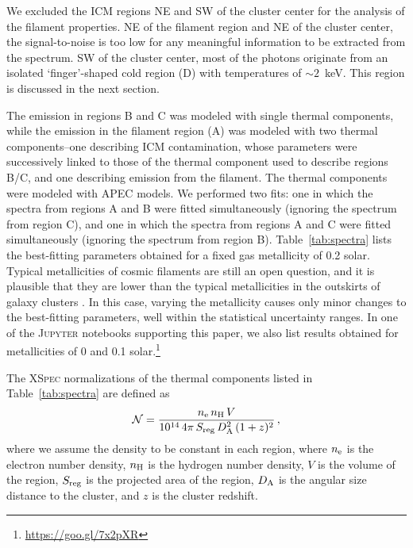 \documentclass[11pt,a4paper,useAMS,iop]{emulateapj}
\begin{document}
We excluded the ICM regions NE and SW of the cluster center for the analysis of the filament properties. NE of the filament region and NE of the cluster center, the signal-to-noise is too low for any meaningful information to be extracted from the spectrum. SW of the cluster center, most of the photons originate from an isolated `finger'-shaped cold region (D) with temperatures of $\sim 2$~keV. This region is discussed in the next section. 

The emission in regions B and C was modeled with single thermal components, while the emission in the filament region (A) was modeled with two thermal components--one describing ICM contamination, whose parameters were successively linked to those of the thermal component used to describe regions B/C, and one describing emission from the filament. The thermal components were modeled with APEC models. We performed two fits: one in which the spectra from regions A and B were fitted simultaneously (ignoring the spectrum from region C), and one in which the spectra from regions A and C were fitted simultaneously (ignoring the spectrum from region B). Table~\ref{tab:spectra} lists the best-fitting parameters obtained for a fixed gas metallicity of 0.2 solar. Typical metallicities of cosmic filaments are still an open question, and it is plausible that they are lower than the typical metallicities in the outskirts of galaxy clusters \citep[$\sim 0.2-0.3$ solar; e.g.][]{Simionescu2015}. In this case, varying the metallicity causes only minor changes to the best-fitting parameters, well within the statistical uncertainty ranges. In one of the \textsc{Jupyter} notebooks supporting this paper, we also list results obtained for metallicities of 0 and 0.1 solar.\footnote{\url{https://goo.gl/7x2pXR}}

The \textsc{XSpec} normalizations of the thermal components listed in Table~\ref{tab:spectra} are defined as
\begin{equation}
	\mathcal{N} = \frac{n_{\rm e} \, n_{\rm H} \, V}{10^{14} \, 4\pi \, S_{\rm reg} \, D_{\rm A}^2 \, (1+z)^2} \, , 
\label{eq:norm}
\end{equation}
where we assume the density to be constant in each region, where $n_{\rm e}$ is the electron number density, $n_{\rm H}$ is the hydrogen number density, $V$ is the volume of the region, $S_{\rm reg}$ is the projected area of the region, $D_{\rm A}$ is the angular size distance to the cluster, and $z$ is the cluster redshift.
\end{document}

